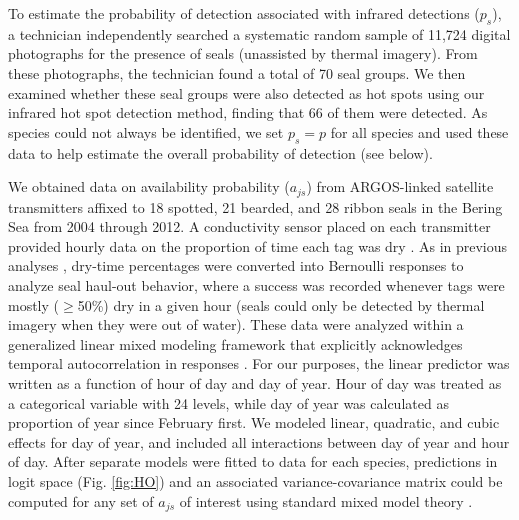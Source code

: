 \documentclass[12pt,fleqn]{article}
\begin{document}
\begin{flushleft}
\hspace{.5in}To estimate the probability of detection associated with infrared detections ($p_s$), a technician independently searched a systematic random sample of 11,724 digital photographs for the presence of seals (unassisted by thermal imagery).  From these photographs, the technician found a total of 70 seal groups. We then examined whether these seal groups were also detected as hot spots using our infrared hot spot detection method, finding that 66 of them were detected.  As species could not always be identified, we set $p_s=p$ for all species and used these data to help estimate the overall probability of detection (see below).

\hspace{.5in}We obtained data on availability probability ($a_{js}$) from ARGOS-linked satellite transmitters affixed to 18 spotted, 21 bearded, and 28 ribbon seals in the Bering Sea from 2004 through 2012.  A conductivity sensor placed on each transmitter provided hourly data on the proportion of time each tag was dry .  As in previous analyses \citep[e.g.][]{BengtsonEtAl2005,VerHoefEtAl2010}, dry-time percentages were converted into Bernoulli responses to analyze seal haul-out behavior, where a success was recorded whenever tags were mostly ($\ge$50\%) dry in a given hour (seals could only be detected by thermal imagery when they were out of water).  These data were analyzed within a generalized linear mixed modeling framework that explicitly acknowledges temporal autocorrelation in responses \citep[see ][]{VerHoefEtAl2010}.  For our purposes, the linear predictor was written as a function of hour of day and day of year.  Hour of day was treated as a categorical variable with 24 levels, while day of year was calculated as proportion of year since February first.  We modeled linear, quadratic, and cubic effects for day of year, and included all interactions between day of year and hour of day.  After separate models were fitted to data for each species, predictions in logit space (Fig. \ref{fig:HO}) and an associated variance-covariance matrix could be computed for any set of $a_{js}$ of interest using standard mixed model theory \citep[see e.g.][]{LittellEtAl1996,VerHoefEtAl2013}.


\end{flushleft}
\end{document}
